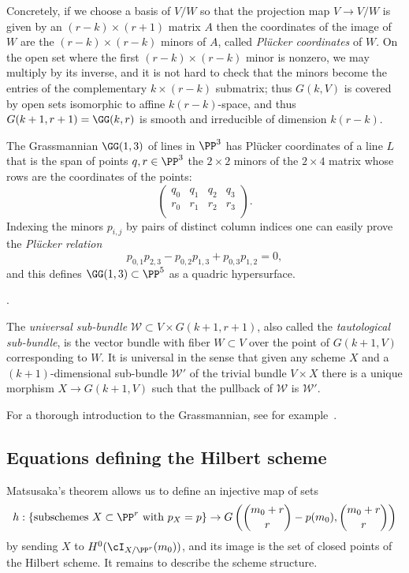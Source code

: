 Concretely, if
we choose a basis of $V/W$ so that the projection map $V \to V/W$ is given by an $(r-k)\times (r+1)$
matrix $A$ then the coordinates of the image of $W$ are the $(r-k)\times (r-k)$ minors of $A$,
called \emph{Pl\"ucker coordinates} of $W$. On the open set where the first $(r-k)\times (r-k)$
minor is nonzero, we may multiply by its inverse, and it is not hard to check that the
minors become the entries of the complementary $k \times (r-k)$ submatrix; thus
 $G(k,V)$ is covered by open sets isomorphic to affine $k(r-k)$-space, and  thus $G(k+1,r+1) = \GG(k,r)$ is smooth and
 irreducible of dimension $k(r-k)$. 
 
 
\begin{example}
The Grassmannian $\GG(1,3)$ of lines in $\PP^{3}$ has Pl\"ucker coordinates of a line
$L$ that is the span of points $q,r\in \PP^{3}$ the $2\times 2$ minors of the $2\times 4$ matrix
whose rows are the coordinates of the points:
$$
\begin{pmatrix}
q_{0}&q_{1}&q_{2}&q_{3}\\
r_{0}&r_{1}&r_{2}&r_{3}\\
\end{pmatrix}.
$$
Indexing the minors $p_{i,j}$ by pairs of distinct column indices one can easily prove the
\emph{Pl\"ucker relation}
$$
p_{0,1}p_{2,3} - p_{0,2}p_{1,3}+p_{0,3}p_{1,2} = 0,
$$
and this defines $\GG(1,3)\subset \PP^{5}$ as a quadric hypersurface.
\end{example}.


\def\sW{{\mathcal W}}

The \emph{universal sub-bundle} $\sW \subset V\times G(k+1,r+1)$, also called the \emph{tautological sub-bundle},  is
the vector bundle with fiber
 $W\subset V$ over the point of $G(k+1,V)$ corresponding to $W$. It is universal in the sense that
 given any scheme $X$ and a $(k+1)$-dimensional sub-bundle $\sW'$ of the trivial bundle $V\times X$
there is a unique morphism $X\to G(k+1,V)$ such that the pullback of $\sW$ is $\sW'$.

For a thorough introduction to the Grassmannian, see for example~\cite[Chapters 3--5]{3264}.

 \subsection{Equations defining the Hilbert scheme}\label{eqns of Hilb}

Matsusaka's theorem allows us to define an injective map of sets
$$
h : \left\{ \text{subschemes $X \subset \PP^r$ with $p_X=p$} \right\}  \to G\left(\binom{m_0+r}{r} - p(m_0),\binom{m_0+r}{r} \right)
$$
by sending $X$ to $H^0(\cI_{X/\PP^r}(m_0))$, and its image is the set of closed points of the Hilbert scheme.
It remains to describe the scheme structure.

